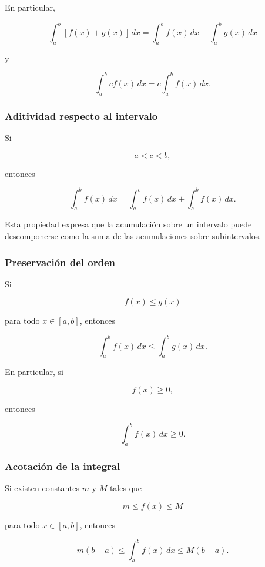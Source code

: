 \documentclass[12pt]{article}
\begin{document}
En particular,

\[
\int_a^b [f(x)+g(x)]\,dx
=
\int_a^b f(x)\,dx
+
\int_a^b g(x)\,dx
\]

y

\[
\int_a^b cf(x)\,dx
=
c\int_a^b f(x)\,dx.
\]


\subsubsection*{Aditividad respecto al intervalo}

Si

\[
a<c<b,
\]

entonces

\[
\boxed{
\int_a^b f(x)\,dx
=
\int_a^c f(x)\,dx
+
\int_c^b f(x)\,dx.
}
\]

Esta propiedad expresa que la acumulación sobre un intervalo puede
descomponerse como la suma de las acumulaciones sobre subintervalos.


\subsubsection*{Preservación del orden}

Si

\[
f(x)\leq g(x)
\]

para todo $x\in[a,b]$, entonces

\[
\boxed{
\int_a^b f(x)\,dx
\leq
\int_a^b g(x)\,dx.
}
\]

En particular, si

\[
f(x)\geq0,
\]

entonces

\[
\int_a^b f(x)\,dx\geq0.
\]


\subsubsection*{Acotación de la integral}

Si existen constantes $m$ y $M$ tales que

\[
m\leq f(x)\leq M
\]

para todo $x\in[a,b]$, entonces

\[
\boxed{
m(b-a)
\leq
\int_a^b f(x)\,dx
\leq
M(b-a).
}
\]
\end{document}
